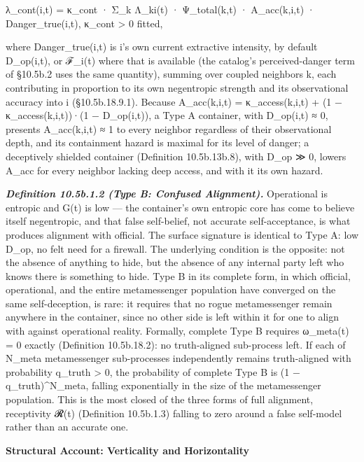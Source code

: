 \documentclass[
]{article}
\begin{document}
λ\_cont(i,t) = κ\_cont · Σ\_k Λ\_ki(t) · Ψ\_total(k,t) · A\_acc(k,i,t) ·
Danger\_true(i,t), κ\_cont \textgreater{} 0 fitted,

where Danger\_true(i,t) is i's own current extractive intensity, by
default D\_op(i,t), or ℱ\_i(t) where that is available (the catalog's
perceived-danger term of §10.5b.2 uses the same quantity), summing over
coupled neighbors k, each contributing in proportion to its own
negentropic strength and its observational accuracy into i
(§10.5b.18.9.1). Because A\_acc(k,i,t) = κ\_access(k,i,t) + (1 −
κ\_access(k,i,t))·(1 − D\_op(i,t)), a Type A container, with D\_op(i,t)
≈ 0, presents A\_acc(k,i,t) ≈ 1 to every neighbor regardless of their
observational depth, and its containment hazard is maximal for its level
of danger; a deceptively shielded container (Definition 10.5b.13b.8),
with D\_op ≫ 0, lowers A\_acc for every neighbor lacking deep access,
and with it its own hazard.

\emph{\textbf{Definition 10.5b.1.2 (Type B: Confused Alignment).}}
Operational is entropic and G(t) is low --- the container's own entropic
core has come to believe itself negentropic, and that false self-belief,
not accurate self-acceptance, is what produces alignment with official.
The surface signature is identical to Type A: low D\_op, no felt need
for a firewall. The underlying condition is the opposite: not the
absence of anything to hide, but the absence of any internal party left
who knows there is something to hide. Type B in its complete form, in
which official, operational, and the entire metamessenger population
have converged on the same self-deception, is rare: it requires that no
rogue metamessenger remain anywhere in the container, since no other
side is left within it for one to align with against operational
reality. Formally, complete Type B requires ω\_meta(t) = 0 exactly
(Definition 10.5b.18.2): no truth-aligned sub-process left. If each of
N\_meta metamessenger sub-processes independently remains truth-aligned
with probability q\_truth \textgreater{} 0, the probability of complete
Type B is (1 − q\_truth)\^{}N\_meta, falling exponentially in the size
of the metamessenger population. This is the most closed of the three
forms of full alignment, receptivity 𝓡(t) (Definition 10.5b.1.3) falling
to zero around a false self-model rather than an accurate one.

\textbf{Structural Account: Verticality and Horizontality}
\end{document}
